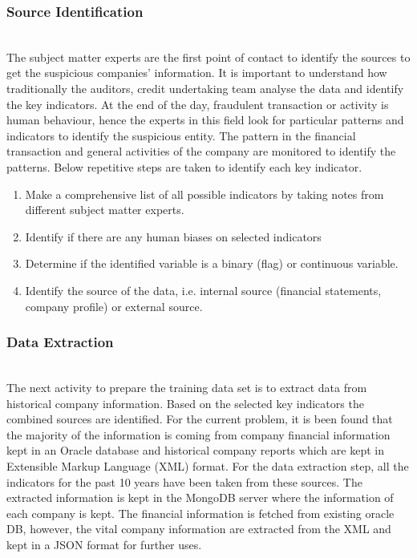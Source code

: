 \subsubsection{Source Identification}\hspace*{\fill} \\
The subject matter experts are the first point of contact to identify the sources to get the suspicious companies' information. It is important to understand how traditionally the auditors, credit undertaking team analyse the data and identify the key indicators. At the end of the day, fraudulent transaction or activity is human behaviour, hence the experts in this field look for particular patterns and indicators to identify the suspicious entity. The pattern in the financial transaction and general activities of the company are monitored to identify the patterns. Below repetitive steps are taken to identify each key indicator.


\begin{enumerate}
    \item Make a comprehensive list of all possible indicators by taking notes from different subject matter experts. 
    \item Identify if there are any human biases on selected indicators  
    \item Determine if the identified variable is a binary (flag) or continuous variable. 
    \item Identify the source of the data, i.e. internal source (financial statements, company profile) or external source. 
\end{enumerate}


\subsubsection{Data Extraction}\hspace*{\fill} \\
The next activity to prepare the training data set is to extract data from historical company information. Based on the selected key indicators the combined sources are identified. For the current problem, it is been found that the majority of the information is coming from company financial information kept in an Oracle database and historical company reports which are kept in Extensible Markup Language (XML) format. For the data extraction step, all the indicators for the past 10 years have been taken from these sources. The extracted information is kept in the MongoDB server where the information of each company is kept. The financial information is fetched from existing oracle DB, however, the vital company information are extracted from the XML and kept in a JSON format for further uses. 


